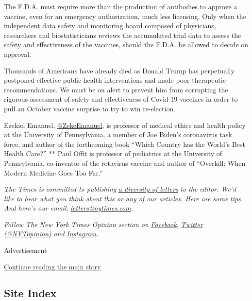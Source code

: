 The F.D.A. must require more than the production of antibodies to
approve a vaccine, even for an emergency authorization, much less
licensing. Only when the independent data safety and monitoring board
composed of physicians, researchers and biostatisticians reviews the
accumulated trial data to assess the safety and effectiveness of the
vaccines, should the F.D.A. be allowed to decide on approval.

Thousands of Americans have already died as Donald Trump has perpetually
postponed effective public health interventions and made poor
therapeutic recommendations. We must be on alert to prevent him from
corrupting the rigorous assessment of safety and effectiveness of
Covid-19 vaccines in order to pull an October vaccine surprise to try to
win re-election.

Ezekiel Emanuel,
\href{https://www.google.com/search?q=\%40ZekeEmanuel\&rlz=1C5CHFA_enUS745US745\&oq=\%40ZekeEmanuel\&aqs=chrome..69i57.1069j0j4\&sourceid=chrome\&ie=UTF-8}{@ZekeEmanuel},
is professor of medical ethics and health policy at the University of
Pennsylvania, a member of Joe Biden's coronavirus task force, and author
of the forthcoming book ``Which Country has the World's Best Health
Care?'' ** Paul Offit is professor of pediatrics at the University of
Pennsylvania, co-inventor of the rotavirus vaccine and author of
``Overkill: When Modern Medicine Goes Too Far.''

\emph{The Times is committed to publishing}
\href{https://www.nytimes.com/2019/01/31/opinion/letters/letters-to-editor-new-york-times-women.html}{\emph{a
diversity of letters}} \emph{to the editor. We'd like to hear what you
think about this or any of our articles. Here are some}
\href{https://help.nytimes.com/hc/en-us/articles/115014925288-How-to-submit-a-letter-to-the-editor}{\emph{tips}}\emph{.
And here's our email:}
\href{mailto:letters@nytimes.com}{\emph{letters@nytimes.com}}\emph{.}

\emph{Follow The New York Times Opinion section on}
\href{https://www.facebook.com/nytopinion}{\emph{Facebook}}\emph{,}
\href{http://twitter.com/NYTOpinion}{\emph{Twitter (@NYTopinion)}}
\emph{and}
\href{https://www.instagram.com/nytopinion/}{\emph{Instagram}}\emph{.}

Advertisement

\protect\hyperlink{after-bottom}{Continue reading the main story}

\hypertarget{site-index}{%
\subsection{Site Index}\label{site-index}}

